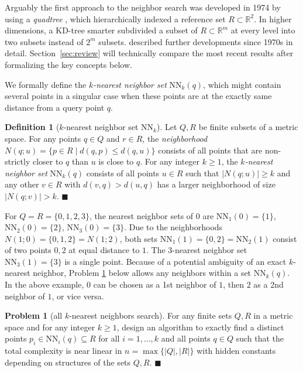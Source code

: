 \documentclass[a4paper,UKenglish,cleveref, autoref]{lipics-v2019}
\numberwithin{algocf}{section}
\theoremstyle{definition}
\newtheorem{dfn}[algocf]{Definition}
\newtheorem{pro}[algocf]{Problem}
\theoremstyle{definition}
\theoremstyle{definition}
\theoremstyle{plain}
\newcommand{\R}{\mathbb{R}}
\newcommand{\NN}{\mathrm{NN}}
\newcommand{\bs}{\hfill $\blacksquare$}
\begin{document}
Arguably the first approach to the neighbor search was developed in 1974 by using a \emph{quadtree} \cite{finkel1974quad}, which hierarchically indexed a reference set $R\subset\R^2$.
In higher dimensions, a KD-tree \cite{bentley1975multidimensional} smarter subdivided a subset of $R\subset\R^m$ at every level into two subsets instead of $2^m$ subsets. 
\cite[Section~1]{elkin2021new} described further developments since 1970s in detail.
Section~\ref{sec:review} will technically compare the most recent results after formalizing the key concepts below.
\medskip

We formally define the \emph{$k$-nearest neighbor set} $\NN_k(q)$, which might contain several points in a singular case when these points are at the exactly same distance from a query point $q$.

\begin{dfn}[$k$-nearest neighbor set $\NN_k$]
\label{dfn:kNearestNeighbor}
Let $Q,R$ be finite subsets of a metric space. 
For any points $q \in Q$ and $r\in R$, the \emph{neighborhood} 
$N(q; u) = \{p \in R \mid d(q,p) \leq d(q,u)\}$ consists of all points that are non-strictly closer to $q$ than $u$ is close to $q$. 
For any integer $k\geq 1$, the \emph{$k$-nearest neighbor set} $\NN_k(q)$ consists of all points $u\in R$ such that $|N(q;u)|\geq k$ and any other $v\in R$ with $d(v,q) > d(u,q)$ has a larger neighborhood of size $|N(q;v)| > k$. 
\bs
\end{dfn}

For $Q = R = \{0,1,2,3\}$, the nearest neighbor sets of $0$ are
$\NN_1(0) = \{1\}$, $\NN_2(0) = \{2\}$, $\NN_3(0) = \{3\}$.
Due to the neighborhoods $N(1;0)=\{0,1,2\}=N(1;2)$, both sets $\NN_1(1) = \{0,2\}=\NN_2(1)$ consist of two points $0,2$ at equal distance to $1$.
The 3-nearest neighbor set $\NN_3(1) = \{3\}$ is a single point.
Because of a potential ambiguity of an exact $k$-nearest neighbor, Problem \ref{pro:knn} below allows any neighbors within a set $\NN_k(q)$.
In the above example, $0$ can be chosen as a 1st neighbor of $1$, then $2$ as a 2nd neighbor of $1$, or vice versa.

\begin{pro}[all $k$-nearest neighbors search]
\label{pro:knn}
For any finite sets $Q,R$ in a metric space and for any integer $k\geq 1$, design an algorithm to exactly find a distinct points $p_i\in\NN_{i}(q) \subseteq R$ for all $i = 1,..., k$ and all points $q\in Q$ such that the total complexity is near linear in $n=\max\{|Q|,|R|\}$ with hidden constants depending on structures of the sets $Q,R$. 
\bs
\end{pro}
\end{document}
